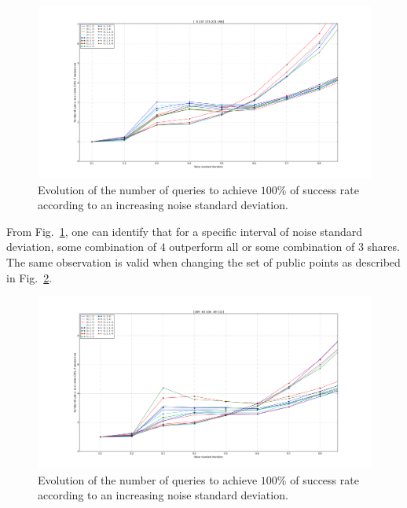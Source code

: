 \documentclass{llncs}
\begin{document}
\begin{figure}
\begin{center}
\includegraphics[width=1\textwidth]{Figure/5_237_zoom.png}
\caption{Evolution of the number of queries to achieve $100\%$ of success rate according to an increasing noise standard deviation.}
\label{fig_4_shares}
\end{center}
\end{figure}

From Fig.~\ref{fig_4_shares}, one can identify that for a specific interval of noise standard deviation, some combination of $4$ outperform all or some combination of $3$ shares. The same observation is valid when changing the set of public points as described in Fig.~\ref{fig_4_shares_bis}.

\begin{figure}
\begin{center}
\includegraphics[width=1\textwidth]{Figure/169_63_zoom.png}
\caption{Evolution of the number of queries to achieve $100\%$ of success rate according to an increasing noise standard deviation.}
\label{fig_4_shares_bis}
\end{center}
\end{figure}
\end{document}
